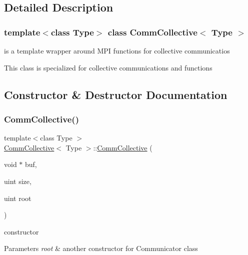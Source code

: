 \subsection{Detailed Description}
\subsubsection*{template$<$class Type$>$\newline
class Comm\+Collective$<$ Type $>$}

is a template wrapper around M\+PI functions for collective communicatios 

This class is specialized for collective communications and functions 

\subsection{Constructor \& Destructor Documentation}
\mbox{\label{classCommCollective_ad583efe49e3dd7883f76dcb82b34cebb}} 
\subsubsection{\texorpdfstring{Comm\+Collective()}{CommCollective()}\hspace{0.1cm}{\footnotesize\ttfamily [1/2]}}
{\footnotesize\ttfamily template$<$class Type $>$ \\
\mbox{\hyperlink{classCommCollective}{Comm\+Collective}}$<$ Type $>$\+::\mbox{\hyperlink{classCommCollective}{Comm\+Collective}} (\begin{DoxyParamCaption}\item[{void $\ast$}]{buf,  }\item[{uint}]{size,  }\item[{uint}]{root }\end{DoxyParamCaption})}

constructor 
\begin{DoxyParams}{Parameters}
{\em root} & another constructor for Communicator class \\
\hline
\end{DoxyParams}
\mbox{\label{classCommCollective_a9315504a2e5e83cb04f3b8e80b7ff3d5}} 
